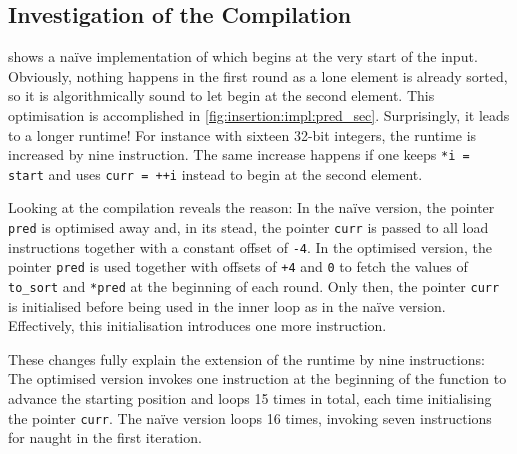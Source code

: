 \subsection{Investigation of the Compilation}
\label{sec:tasklet:insertion:compilation}

 shows a naïve implementation of \IS{} which begins at the very start of the input.
Obviously, nothing happens in the first round as a lone element is already sorted, so it is algorithmically sound to let \IS{} begin at the second element.
This optimisation is accomplished in \cref{fig:insertion:impl:pred_sec}.
Surprisingly, it leads to a longer runtime!
For instance with sixteen 32-bit integers, the runtime is increased by nine instruction.
The same increase happens if one keeps \lstinline|*i = start| and uses \lstinline|curr = ++i| instead to begin at the second element.

Looking at the compilation reveals the reason:
In the naïve version, the pointer \lstinline|pred| is optimised away and, in its stead, the pointer \lstinline|curr| is passed to all load instructions together with a constant offset of \lstinline|-4|.
In the optimised version, the pointer \lstinline|pred| is used together with offsets of \lstinline|+4| and \lstinline|0| to fetch the values of \lstinline|to_sort| and \lstinline|*pred| at the beginning of each round.
Only then, the pointer \lstinline|curr| is initialised before being used in the inner loop as in the naïve version.
Effectively, this initialisation introduces one more instruction.

These changes fully explain the extension of the runtime by nine instructions:
The optimised version invokes one instruction at the beginning of the function to advance the starting position and loops 15 times in total, each time initialising the pointer \lstinline|curr|.
The naïve version loops 16 times, invoking seven instructions for naught in the first iteration.

